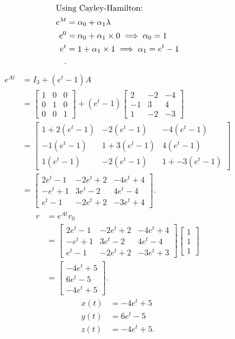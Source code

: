 \documentclass{zc-ust-hw}
\begin{document}
\begin{enumerate}
\begin{enumerate}
\begin{sol}
\begin{align}
           \intertext{Using Cayley-Hamilton:}
            e^{\lambda t} &= \alpha_{0} + \alpha_{1} \lambda \\
            e^{0} &= \alpha_{0} + \alpha_{1} \times 0 \implies \alpha_{0} = 1 \\ 
            e^{t} &= 1 + \alpha_{1} \times 1 \implies \alpha_{1} = e^{t} - 1 \\
          .\end{align}
          \begin{align}
            e^{At} &= I_{3} + (e^{t}-1)A \\
            &= \begin{bmatrix} 1&0&0\\0&1&0\\0&0&1 \end{bmatrix} + (e^{t}-1) \begin{bmatrix} 2&-2&-4\\-1&3&4\\1&-2&-3 \end{bmatrix} \\
            &= \begin{bmatrix} 1+2(e^{t}-1)&-2(e^{t}-1)&-4(e^{t}-1)\\-1(e^{t}-1)&1+3(e^{t}-1)&4(e^{t}-1)\\1(e^{t}-1)&-2(e^{t}-1)&1+-3(e^{t}-1) \end{bmatrix} \\
            &= \begin{bmatrix} 2e^{t}-1&-2e^{t}+2&-4e^{t}+4\\-e^{t}+1&3e^{t}-2&4e^{t}-4\\e^{t}-1&-2e^{t}+2&-3e^{t}+4 \end{bmatrix}
          .\end{align}
          \begin{align}
            r &= e^{At}r_{0} \\
            &= \begin{bmatrix} 2e^{t}-1&-2e^{t}+2&-4e^{t}+4\\-e^{t}+1&3e^{t}-2&4e^{t}-4\\e^{t}-1&-2e^{t}+2&-3e^{t}+3 \end{bmatrix} \begin{bmatrix} 1\\1\\1 \end{bmatrix} \\
            &= \begin{bmatrix} -4e^{t}+5\\6e^{t}-5\\-4e^{t}+5 \end{bmatrix}
          .\end{align}
          \begin{align}
            x(t) &= -4e^{t}+5 \\
            y(t) &= 6e^{t}-5 \\
            z(t) &= -4e^{t}+5
          .\end{align}
        \end{sol}
    \end{enumerate}


\end{enumerate}
\end{document}
